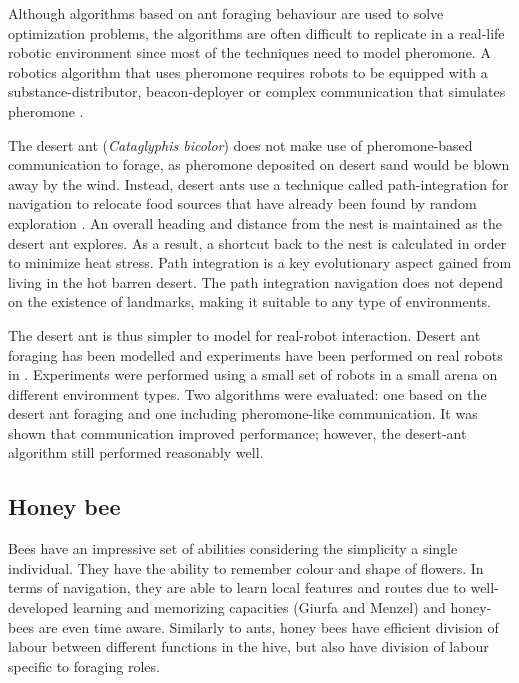 Although algorithms based on ant foraging behaviour are used to solve optimization problems, the algorithms are often difficult to replicate in a real-life robotic environment since most of the techniques need to model pheromone. A robotics algorithm that uses pheromone requires robots to be equipped with a substance-distributor, beacon-deployer or complex communication that simulates pheromone \cite{hoff2010two}.

The desert ant (\textit{Cataglyphis bicolor}) does not make use of pheromone-based communication to forage, as pheromone deposited on desert sand would be blown away by the wind. Instead, desert ants use a technique called path-integration for navigation to relocate food sources that have already been found by random exploration \cite{collett1998local}. An overall heading and distance from the nest is maintained as the desert ant explores. As a result, a shortcut back to the nest is calculated in order to minimize heat stress. Path integration is a key evolutionary aspect gained from living in the hot barren desert. The path integration navigation does not depend on the existence of landmarks, making it suitable to any type of environments. 

The desert ant is thus simpler to model for real-robot interaction. Desert ant foraging has been modelled and experiments have been performed on real robots in \cite{hecker2012formica}. Experiments were performed using a small set of robots in a small arena on different environment types. Two algorithms were evaluated: one based on the desert ant foraging and one including pheromone-like communication. It was shown that communication improved performance; however, the desert-ant algorithm still performed reasonably well. 


\subsection{Honey bee}
Bees have an impressive set of abilities considering the simplicity a single individual. They have the ability to remember colour and shape of flowers. In terms of navigation, they are able to learn local features and routes due to well-developed learning and memorizing capacities (Giurfa and Menzel) and honey-bees are even time aware. Similarly to ants, honey bees have efficient division of labour between different functions in the hive, but also have division of labour specific to foraging roles.

